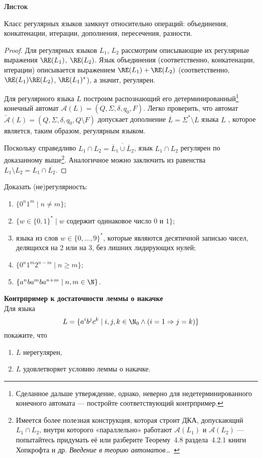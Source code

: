 \begin{center}
{\bfseries\Large \textsc{Листок \Lnum}}
\end{center}

\begin{Thm}Класс регулярных языков замкнут относительно операций: объединения,
конкатенации, итерации, дополнения, пересечения, разности.
\end{Thm}
\begin{proof}Для регулярных языков $L_1$, $L_2$ рассмотрим описывающие
их регулярные выражения $\RE(L_1)$, $\RE(L_2)$. Язык объединения
(соответственно, конкатенации, итерации) описывается выражением $\RE(L_1) +
\RE(L_2)$ (соответственно, $\RE(L_1)\RE(L_2)$, $\RE(L_1)^\ast$), а значит,
регулярен.

Для регулярного языка $L$ построим распознающий его
детерминированный\footnote{Сделанное дальше утверждение, однако, неверно для
недетерминированного конечного автомата — постройте соответствующий контрпример.
\HW} конечный автомат $\mathcal A(L) = (Q, \Sigma, \delta, q_0, F)$. Легко
проверить, что автомат $\widetilde{\mathcal A}(L) = (Q, \Sigma, \delta, q_0, Q
\setminus F)$ допускает дополнение $\overline L = \Sigma^\ast \setminus L$ языка
$L$ \HW, которое является, таким образом, регулярным языком.

Поскольку справедливо $L_1 \cap L_2 = \overline{\overline L_1 \cup \overline
L_2}$, язык $L_1 \cap L_2$ регулярен по доказанному выше\footnote{Имеется
более полезная конструкция, которая строит ДКА, допускающий $L_1 \cap L_2$,
внутри которого «параллельно» работают $\mathcal A(L_1)$ и $\mathcal A(L_2)$ — попытайтесь придумать её или
разберите Теорему~4.8 раздела~4.2.1 книги Хопкрофта и др. \emph{Введение в
теорию автоматов\ldots}~\HW}. Аналогичное можно заключить из равенства $L_1
\setminus L_2 = L_1 \cap \overline{L_2}$.
\end{proof}

Доказать (не)регулярность:
\begin{enumerate}
  \item $\{0^n 1^m \mid n \neq m\}$;
  \item $\{ w \in \{0, 1\}^\ast \mid
  \text{$w$ содержит одинаковое число 0 и 1}\}$;
  \item языка из слов $w \in \{0,\ldots, 9\}^\ast$, которые
  являются десятичной записью чисел, делящихся на 2 или на 3, без
  лишних лидирующих нулей;
  \item $\{ 0^n 1^m 2^{n-m} \mid n \geqslant m \}$;
  \item $\{ a^n b a^m b a^{n+m} \mid n, m \in \N \}$.
\end{enumerate}

\textbf{Контрпример к достаточности леммы о накачке}\\
Для языка
$$L = \{a^i b^j c^k \mid i, j, k \in \N_0 \wedge (i=1 \Rightarrow j = k)\}$$
покажите, что
\begin{enumerate}
    \item $L$ нерегулярен, 
    \item $L$ удовлетворяет условию леммы о накачке. 
\end{enumerate}
  